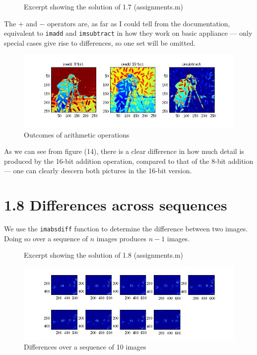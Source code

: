 \documentclass[11pt]{article}
\newcommand{\code}[1]{{\tt #1}}
\newcommand{\codefig}[5]
{
\begin{figure}[H]
    
    \caption{#5 (#2)}
    \label{code:#1}
\end{figure}
}
\begin{document}
\codefig{1-7}{assignments.m}{80}{89}{Excerpt showing the solution of 1.7}

The $+$ and $-$ operators are, as far as I could tell from the documentation,
equivalent to \code{imadd} and \code{imsubtract} in how they work on basic
appliance --- only special cases give rise to differences, so one set will be
omitted.

\begin{figure}[H]
    \hspace{-1cm}\includegraphics[scale=0.75]{figures/1-7.jpg}
    \caption{Outcomes of arithmetic operations}
\end{figure}

As we can see from figure (14), there is a clear difference in how much detail
is produced by the 16-bit addition operation, compared to that of the 8-bit
addition --- one can clearly descern both pictures in the 16-bit version.


\newpage
\section{1.8 \mdseries Differences across sequences}
\label{sec:1-8}
We use the \code{imabsdiff} function to determine the difference between two
images. Doing so over a sequence of $n$ images produces $n-1$ images.

\codefig{1-8}{assignments.m}{91}{107}{Excerpt showing the solution of 1.8}

\begin{figure}[H]
    \hspace{-3cm}\includegraphics[scale=0.9]{figures/1-8.jpg}
    \caption{Differences over a sequence of 10 images}
\end{figure}
\end{document}

